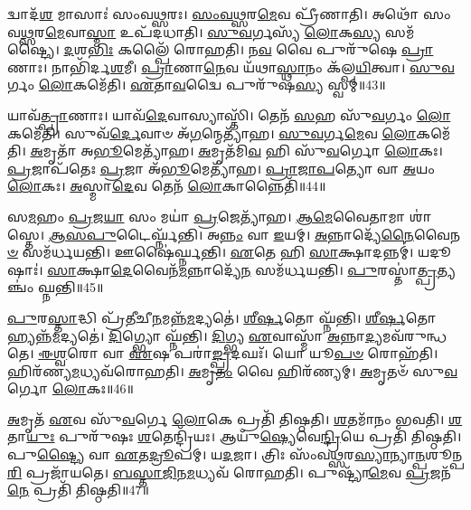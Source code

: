 𑌦𑍍𑌵𑌾𑌦᳴\-\ul{𑌶} 𑌮𑌾𑌸𑌾𑌃॑ 𑌸𑌂𑌵\-\ul{𑌥𑍍𑌸}\-𑌰𑌃।
\-\ul{𑌸𑌂}\-\-\ul{𑌵}\-\-\ul{𑌥𑍍𑌸}\-𑌰\-\ul{𑌮𑍇}\-𑌵 𑌪𑍍𑌰𑍀᳴𑌣𑌾𑌤𑌿।
𑌅𑌥𑍋᳴ 𑌸𑌂𑌵\-\ul{𑌥𑍍𑌸}\-𑌰\-\ul{𑌮𑍇}\-𑌵𑌾\-\ul{𑌸𑍍𑌮𑌾} 𑌉𑌪᳴𑌦𑌧𑌾𑌤𑌿।
\-\ul{𑌸𑍁}\-\-\ul{𑌵}\-𑌰𑍍𑌗𑌸𑍍𑌯᳴ \ul{𑌲𑍋}\-𑌕\-\ul{𑌸𑍍𑌯} 𑌸𑌮᳴𑌷𑍍𑌟𑍍𑌯𑍈।
\-\ul{𑌦}\-𑌶\-\ul{𑌭𑌿𑌃} 𑌕𑌲𑍍𑌪𑍈᳴ 𑌰𑍋𑌹𑌤𑌿।
𑌨\-\ul{𑌵} 𑌵𑍈 𑌪𑍁𑌰𑍁᳴𑌷𑍇 \ul{𑌪𑍍𑌰𑌾}\-𑌣𑌾𑌃।
𑌨𑌾𑌭𑌿᳴𑌰𑍍𑌦\-\ul{𑌶}\-𑌮𑍀।
\-\ul{𑌪𑍍𑌰𑌾}\-𑌣𑌾\-\ul{𑌨𑍇}\-𑌵 𑌯᳴𑌥𑌾\-\ul{𑌸𑍍𑌥𑌾}\-𑌨𑌂 𑌕᳴𑌲𑍍𑌪\-\ul{𑌯𑌿}\-𑌤𑍍𑌵𑌾।
\-\ul{𑌸𑍁}\-\-\ul{𑌵}\-𑌰𑍍𑌗𑌂 \ul{𑌲𑍋}\-𑌕𑌮𑍇᳴𑌤𑌿।
\-\ul{𑌏}\-𑌤𑌾\-\ul{𑌵}\-𑌦𑍍𑌵𑍈 𑌪𑍁𑌰𑍁᳴𑌷\-\ul{𑌸𑍍𑌯} 𑌸𑍍𑌵𑌮𑍍॥43॥

𑌯𑌾𑌵᳴\-\ul{𑌤𑍍𑌪𑍍𑌰𑌾}\-𑌣𑌾𑌃।
𑌯𑌾𑌵᳴\-\ul{𑌦𑍇}\-𑌵𑌾𑌸𑍍𑌯𑌾𑌸𑍍𑌤𑌿᳴।
𑌤𑍇𑌨᳴ \ul{𑌸}\-𑌹 𑌸𑍁᳴\-\ul{𑌵}\-𑌰𑍍𑌗𑌂 \ul{𑌲𑍋}\-𑌕𑌮𑍇᳴𑌤𑌿।
𑌸𑍁𑌵᳴\-\ul{𑌰𑍍𑌦𑍇}\-𑌵𑌾𑍞 𑌅᳴\-\ul{𑌗}\-𑌨𑍍𑌮𑍇𑌤𑍍𑌯𑌾᳴𑌹।
\-\ul{𑌸𑍁}\-\-\ul{𑌵}\-𑌰𑍍𑌗\-\ul{𑌮𑍇}\-𑌵 \ul{𑌲𑍋}\-𑌕𑌮𑍇᳴𑌤𑌿।
\-\ul{𑌅}\-𑌮𑍃𑌤𑌾᳴ 𑌅\-\ul{𑌭𑍂}\-𑌮𑍇𑌤𑍍𑌯𑌾᳴𑌹।
\-\ul{𑌅}\-𑌮𑍃𑌤᳴𑌮𑌿\-\ul{𑌵} 𑌹𑌿 𑌸𑍁᳴\-\ul{𑌵}\-𑌰𑍍𑌗𑍋 \ul{𑌲𑍋}\-𑌕𑌃।
\-\ul{𑌪𑍍𑌰}\-𑌜𑌾𑌪᳴𑌤𑍇𑌃 \ul{𑌪𑍍𑌰}\-𑌜𑌾 𑌅᳴\-\ul{𑌭𑍂}\-𑌮𑍇𑌤𑍍𑌯𑌾᳴𑌹।
\-\ul{𑌪𑍍𑌰𑌾}\-\-\ul{𑌜𑌾}\-\-\ul{𑌪}\-𑌤𑍍𑌯𑍋 𑌵𑌾 \ul{𑌅}\-𑌯𑌂 \ul{𑌲𑍋}\-𑌕𑌃।
\-\ul{𑌅}\-𑌸𑍍𑌮𑌾\-\ul{𑌦𑍇}\-𑌵 𑌤𑍇𑌨᳴ \ul{𑌲𑍋}\-𑌕𑌾𑌨𑍍𑌨𑍈𑌤𑌿᳴॥44॥

𑌸\-\ul{𑌮}\-𑌹𑌂 \ul{𑌪𑍍𑌰}\-𑌜\-\ul{𑌯𑌾} 𑌸𑌂 𑌮𑌯𑌾॑ \ul{𑌪𑍍𑌰}\-𑌜𑍇𑌤𑍍𑌯𑌾᳴𑌹।
\-\ul{𑌆}\-\-\-\ul{𑌮𑍇}\-𑌵𑍈𑌤𑌾𑌮𑌾 𑌶𑌾॑𑌸𑍍𑌤𑍇।
\-\ul{𑌆}\-\-\ul{𑌸}\-\-\ul{𑌪𑍁}\-𑌟𑍈𑌰𑍍𑌘𑍍𑌨᳴𑌨𑍍𑌤𑌿।
𑌅\-\ul{𑌨𑍍𑌨𑌂} 𑌵𑌾 \ul{𑌇}\-𑌯𑌮𑍍।
\-\ul{𑌅}\-𑌨𑍍𑌨𑌾𑌦𑍍𑌯𑍇᳴\-\ul{𑌨𑍈}\-𑌵𑍈\-\ul{𑌨}\-\-\ul{𑍞} 𑌸𑌮᳴𑌰𑍍𑌧𑌯𑌨𑍍𑌤𑌿।
𑌊𑌷𑍈॑𑌰𑍍𑌘𑍍𑌨𑌨𑍍𑌤𑌿।
\-\ul{𑌏}\-𑌤𑍇 𑌹𑌿 \ul{𑌸𑌾}\-𑌕𑍍𑌷𑌾𑌦𑌨𑍍𑌨𑌮𑍍॑।
𑌯𑌦𑍂𑌷𑌾𑌃॑।
\-\ul{𑌸𑌾}\-𑌕𑍍𑌷𑌾\-\ul{𑌦𑍇}\-𑌵𑍈𑌨᳴\-\ul{𑌮}\-𑌨𑍍𑌨𑌾𑌦𑍍𑌯𑍇᳴\-\ul{𑌨} 𑌸𑌮᳴𑌰𑍍𑌧𑌯𑌨𑍍𑌤𑌿।
\-\ul{𑌪𑍁}\-𑌰𑌸𑍍𑌤𑌾॑\-\ul{𑌤𑍍𑌪𑍍𑌰}\-𑌤𑍍𑌯𑌞𑍍𑌚𑌂॑ 𑌘𑍍𑌨𑌨𑍍𑌤𑌿॥45॥

\-\ul{𑌪𑍁}\-𑌰\-\ul{𑌸𑍍𑌤𑌾}\-𑌦𑍍𑌧𑌿 𑌪𑍍𑌰᳴\-\ul{𑌤𑍀}\-𑌚𑍀\-\ul{𑌨}\-𑌮𑌨𑍍𑌨᳴\-\ul{𑌮}\-𑌦𑍍𑌯𑌤𑍇॑।
\-\ul{𑌶𑍀}\-\-\ul{𑌰𑍍}\-\-\ul{𑌷}\-𑌤𑍋 𑌘𑍍𑌨᳴𑌨𑍍𑌤𑌿।
\-\ul{𑌶𑍀}\-\-\ul{𑌰𑍍}\-\-\ul{𑌷}\-𑌤𑍋 𑌹𑍍𑌯𑌨𑍍𑌨᳴\-\ul{𑌮}\-𑌦𑍍𑌯𑌤𑍇॑।
\-\ul{𑌦𑌿}\-𑌗𑍍𑌭𑍍𑌯𑍋 𑌘𑍍𑌨᳴𑌨𑍍𑌤𑌿।
\-\ul{𑌦𑌿}\-𑌗𑍍𑌭𑍍𑌯 \ul{𑌏}\-𑌵𑌾𑌸𑍍𑌮𑌾᳴ \ul{𑌅}\-𑌨𑍍𑌨𑌾\-\ul{𑌦𑍍𑌯}\-𑌮𑌵᳴𑌰𑍁𑌨𑍍𑌧𑌤𑍇।
\-\ul{𑌈}\-\-\ul{𑌶𑍍𑌵}\-𑌰𑍋 𑌵𑌾 \ul{𑌏}\-𑌷 𑌪𑌰𑌾॑\-\ul{𑌙𑍍𑌪𑍍𑌰}\-𑌦𑌘𑌃᳴।
𑌯𑍋 𑌯𑍂\-\ul{𑌪}\-\-\ul{𑍞} 𑌰𑍋𑌹᳴𑌤𑌿।
𑌹𑌿𑌰᳴𑌣𑍍𑌯\-\ul{𑌮}\-𑌧𑍍𑌯𑌵᳴𑌰𑍋𑌹𑌤𑌿।
\-\ul{𑌅}\-𑌮𑍃\-\ul{𑌤𑌂} 𑌵𑍈 𑌹𑌿𑌰᳴𑌣𑍍𑌯𑌮𑍍।
\-\ul{𑌅}\-𑌮𑍃𑌤𑍞᳴ 𑌸𑍁\-\ul{𑌵}\-𑌰𑍍𑌗𑍋 \ul{𑌲𑍋}\-𑌕𑌃॥46॥

\-\ul{𑌅}\-𑌮𑍃𑌤᳴ \ul{𑌏}\-𑌵 𑌸𑍁᳴\-\ul{𑌵}\-𑌰𑍍𑌗𑍇 \ul{𑌲𑍋}\-𑌕𑍇 𑌪𑍍𑌰𑌤𑌿᳴ 𑌤𑌿𑌷𑍍𑌠𑌤𑌿।
\-\ul{𑌶}\-𑌤𑌮𑌾᳴𑌨𑌂 𑌭𑌵𑌤𑌿।
\-\ul{𑌶}\-𑌤𑌾\-\ul{𑌯𑍁𑌃} 𑌪𑍁𑌰𑍁᳴𑌷𑌃 \ul{𑌶}\-𑌤𑍇𑌨𑍍𑌦𑍍𑌰𑌿᳴𑌯𑌃।
𑌆𑌯𑍁᳴\-\ul{𑌷𑍍𑌯𑍇}\-𑌵𑍇\-\ul{𑌨𑍍𑌦𑍍𑌰𑌿}\-𑌯𑍇 𑌪𑍍𑌰𑌤𑌿᳴ 𑌤𑌿𑌷𑍍𑌠𑌤𑌿।
𑌪𑍁\-\ul{𑌷𑍍𑌟𑍍𑌯𑍈} 𑌵𑌾 \ul{𑌏}\-𑌤\-\ul{𑌦𑍍𑌰𑍂}\-𑌪𑌮𑍍।
𑌯\-\ul{𑌦}\-𑌜𑌾।
𑌤𑍍𑌰𑌿𑌃 𑌸𑌂᳴𑌵\-\ul{𑌥𑍍𑌸}\-𑌰\-\ul{𑌸𑍍𑌯𑌾}\-𑌨𑍍𑌯𑌾\-\ul{𑌨𑍍𑌪}\-𑌶𑍂𑌨𑍍𑌪\-\ul{𑌰𑌿} 𑌪𑍍𑌰𑌜𑌾᳴𑌯𑌤𑍇।
\-\ul{𑌬}\-\-\ul{𑌸𑍍𑌤𑌾}\-\-\ul{𑌜𑌿}\-𑌨\-\ul{𑌮}\-𑌧𑍍𑌯𑌵᳴ 𑌰𑍋𑌹𑌤𑌿।
𑌪𑍁𑌷𑍍𑌟𑍍𑌯𑌾᳴\-\ul{𑌮𑍇}\-𑌵 \ul{𑌪𑍍𑌰}\-𑌜𑌨᳴\-\ul{𑌨𑍇} 𑌪𑍍𑌰𑌤𑌿᳴ 𑌤𑌿𑌷𑍍𑌠𑌤𑌿॥47॥\anuvakamend[\-\ul{𑌪}\-\-\ul{𑌰𑌿}\-\-\ul{𑌧𑌾}\-𑌪𑌯᳴𑌤𑌿 \ul{𑌗𑍋}\-𑌧𑍂𑌮𑌾᳴ 𑌜𑍁𑌹𑍋\-\ul{𑌤𑌿} 𑌸𑍍𑌵𑌂 𑌨𑍈𑌤𑌿᳴ \ul{𑌪𑍍𑌰}\-𑌤𑍍𑌯𑌞𑍍𑌚𑌂॑ 𑌘𑍍𑌨𑌨𑍍𑌤𑌿 \ul{𑌲𑍋}\-𑌕𑍋 𑌨𑌵᳴ 𑌚]

